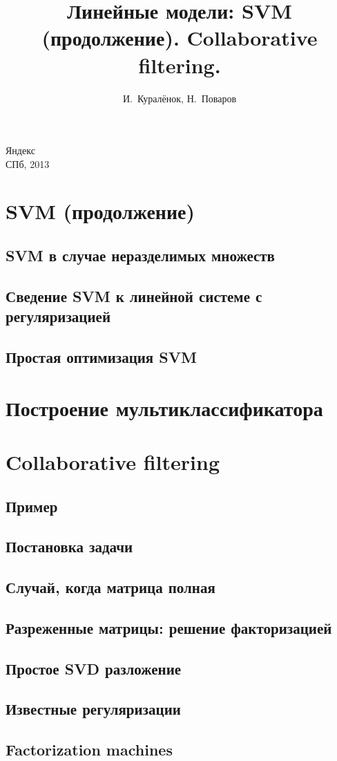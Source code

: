 \documentclass[14pt, fleqn, xcolor={dvipsnames, table}]{beamer}
\title{Линейные модели: SVM (продолжение). Collaborative filtering.\\\small{}}
\author[]{\small{%
И.~Куралёнок,
Н.~Поваров}}
\date{}
\begin{document}
\begin{frame}

\maketitle
\small
\begin{center}
\vspace{-60pt}
\normalsize {\color{red}Я}ндекс \\
\vspace{80pt}
\footnotesize СПб, 2013
\end{center}
\end{frame}

\section{SVM (продолжение)}
\subsection{SVM в случае неразделимых множеств} %
\subsection{Сведение SVM к линейной системе с регуляризацией} %
\subsection{Простая оптимизация SVM} %
\section{Построение мультиклассификатора} %
\section{Collaborative filtering}
\subsection{Пример} %
\subsection{Постановка задачи} %
\subsection{Случай, когда матрица полная} %
\subsection{Разреженные матрицы: решение факторизацией} %
\subsection{Простое SVD разложение}  %
\subsection{Известные регуляризации} %
\subsection{Factorization machines} %
\end{document}
